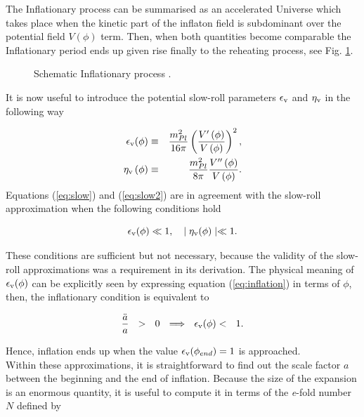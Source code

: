 \documentclass{rmaa}
\def\bea{\begin{eqnarray}}
\def\eea{\end{eqnarray}}
\begin{document}
The Inflationary process can be summarised as an accelerated Universe which takes place when 
the kinetic part of the inflaton field is subdominant over the potential field $V(\phi)$ term. 
Then, when both quantities become comparable the Inflationary period ends up given 
rise finally to the reheating process, see Fig. \ref{fig:Field}. 


\begin{figure}[ht] 
\centerline{ \epsfxsize=180pt  }
\caption{Schematic Inflationary process \citep{Baumann}.}
\label{fig:Field}
\end{figure}

\vspace{0.5cm}
It is now useful to introduce the potential slow-roll parameters 
$\epsilon_{\rm v}$ and $\eta_{\rm v}$ in the following way \citep{Liddle92}


\bea
\epsilon_{\rm v}(\phi) &\equiv&{m^2_{Pl} \over 16 \pi } \left({V'\left(\phi\right) \over V\left(\phi\right)}\right)^2, 
\label{eq:epsi} \\
\eta_{\rm v}\left(\phi\right) &\equiv& \frac{m^2_{Pl}}{8\pi} {V''\left(\phi\right) \over V\left(\phi\right)} \label{eq:eta}.
\eea
%
Equations (\ref{eq:slow}) and (\ref{eq:slow2}) are in agreement with the slow-roll approximation
when the following conditions hold

\begin{equation*}
\epsilon_{\rm v}(\phi) \ll 1,  \,\,\,\,\,\,  \mid \eta_{\rm v}(\phi)\mid \ll 1.
\end{equation*}

\noindent
These conditions are sufficient but not necessary, because the validity of the slow-roll
approximations was a requirement in its derivation.
%
The physical meaning of $\epsilon_{\rm v}(\phi)$ can be explicitly seen by expressing equation (\ref{eq:inflation})
 in terms of $\phi$, then, the inflationary condition is equivalent to
 
 \begin{equation}
 {\ddot a \over a} ~~ > ~~ 0 ~~ \Longrightarrow ~~ \epsilon_{\rm v}(\phi) < ~~  1.
\end{equation}

\noindent
Hence, inflation ends up when the value $\epsilon_{\rm v} (\phi_{end})= 1$ is approached.
\\

Within these approximations, it is straightforward to find out the scale factor $a$ between
the beginning and the end of inflation. Because the size of the expansion is 
an enormous quantity, it is useful to compute it in terms of the 
 {\it e}-fold number $N$ defined by 
 
\end{document}
